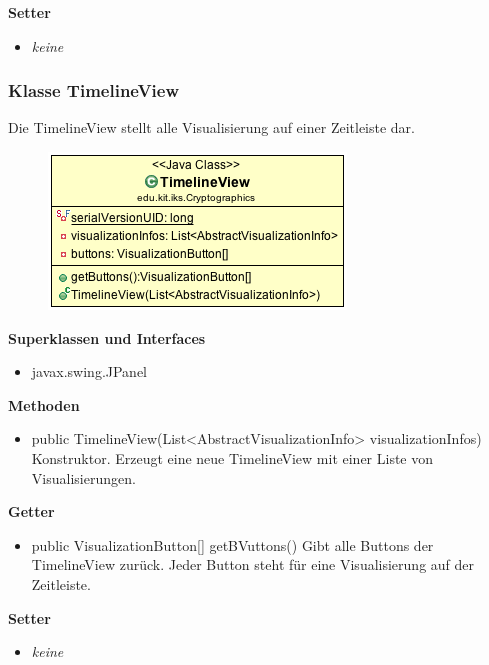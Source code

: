\documentclass{article}
\begin{document}
      \textbf{Setter}
      \begin{itemize}
        \item \textit{keine}
      \end{itemize}

    \subsubsection{Klasse TimelineView}
      Die TimelineView stellt alle Visualisierung auf einer Zeitleiste dar.
      \begin{figure}[H]
        \centering
        \includegraphics{resources/edu-kit-iks-Cryptographics-TimelineView}
      \end{figure}

      \textbf{Superklassen und Interfaces}
      \begin{itemize}
        \item javax.swing.JPanel
      \end{itemize}
      
      \textbf{Methoden}
      \begin{itemize}
        \item public TimelineView(List<AbstractVisualizationInfo> visualizationInfos) \newline
        Konstruktor. Erzeugt eine neue TimelineView mit einer Liste von Visualisierungen.
      \end{itemize}

      \textbf{Getter}
      \begin{itemize}
        \item public VisualizationButton[] getBVuttons() \newline
        Gibt alle Buttons der TimelineView zurück. Jeder Button steht für eine Visualisierung auf der Zeitleiste.
      \end{itemize}

      \textbf{Setter}
      \begin{itemize}
        \item \textit{keine}
      \end{itemize}
\end{document}

